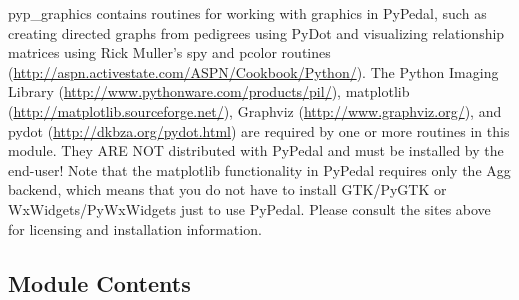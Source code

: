 pyp\_graphics contains routines for working with graphics in PyPedal, such as creating directed graphs from pedigrees using PyDot and visualizing relationship matrices using Rick Muller's spy and pcolor routines (\url{http://aspn.activestate.com/ASPN/Cookbook/Python/}). The Python Imaging Library (\url{http://www.pythonware.com/products/pil/}), matplotlib (\url{http://matplotlib.sourceforge.net/}), Graphviz (\url{http://www.graphviz.org/}), and pydot (\url{http://dkbza.org/pydot.html}) are required by one or more routines in this module. They ARE NOT distributed with PyPedal and must be installed by the end-user! Note that the matplotlib functionality in PyPedal requires only the Agg backend, which means that you do not have to install GTK/PyGTK or WxWidgets/PyWxWidgets just to use PyPedal. Please consult the sites above for licensing and installation information.

\subsection*{Module Contents}

